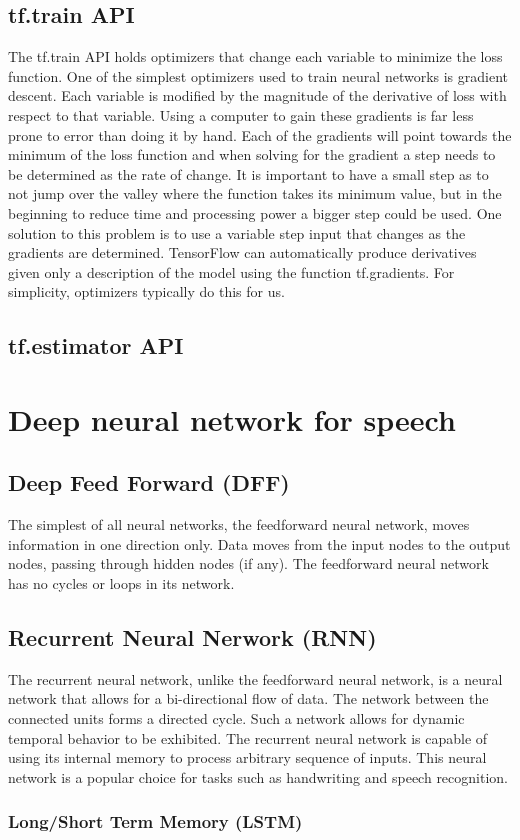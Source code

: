 \subsection{tf.train API}
The tf.train API holds optimizers that change each variable to minimize the loss function. One of the simplest optimizers used to train neural networks is gradient descent. Each variable is modified by the magnitude of the derivative of loss with respect to that variable. Using a computer to gain these gradients is far less prone to error than doing it by hand. Each of the gradients will point towards the minimum of the loss function and when solving for the gradient a step needs to be determined as the rate of change. It is important to  have a small step as to not jump over the valley where the function takes its minimum value, but in the beginning to reduce time and processing power a bigger step could be used. One solution to this problem is to use a variable step input that changes as the gradients are determined. TensorFlow can automatically produce derivatives given only a description of the model using the function tf.gradients. For simplicity, optimizers typically do this for us.
\subsection{tf.estimator API}

\section{Deep neural network for speech}

\subsection{Deep Feed Forward (DFF)}
The simplest of all neural networks, the feedforward neural network, moves information in one direction only. Data moves from the input nodes to the output nodes, passing through hidden nodes (if any). The feedforward neural network has no cycles or loops in its network.

\subsection{Recurrent Neural Nerwork (RNN)}
The recurrent neural network, unlike the feedforward neural network, is a neural network that allows for a bi-directional flow of data. The network between the connected units forms a directed cycle. Such a network allows for dynamic temporal behavior to be exhibited. The recurrent neural network is capable of using its internal memory to process arbitrary sequence of inputs. This neural network is a popular choice for tasks such as handwriting and speech recognition.

\subsubsection{Long/Short Term Memory (LSTM)}

